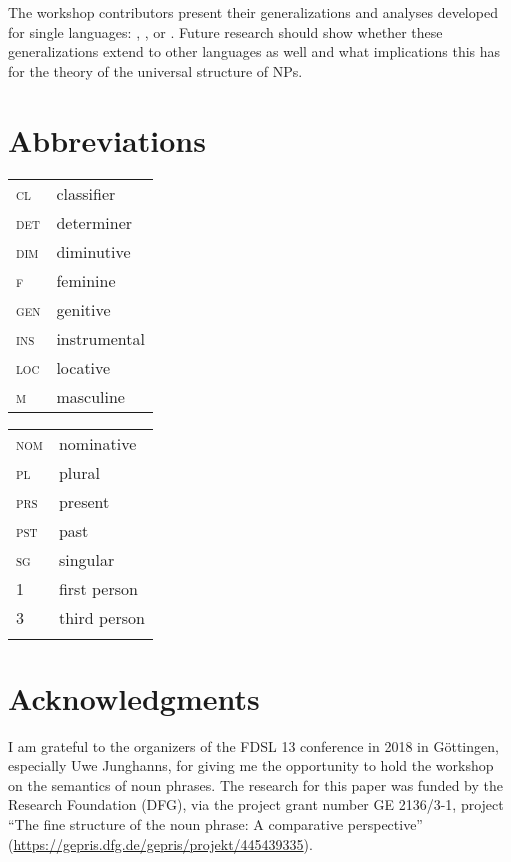 \documentclass[output=paper]{langscibook}
\begin{document}
The workshop contributors present their generalizations and analyses developed for single languages: , , or . Future research should show whether these generalizations extend to other  languages as well and what implications this has for the theory of the universal structure of NPs.

\section*{Abbreviations}

\begin{tabularx}{.5\textwidth}{@{}lX@{}}
\textsc{cl}&{classifier}\\
\textsc{det}&{determiner}\\
\textsc{dim}&{diminutive}\\
\textsc{f}&{feminine}\\
\textsc{gen}&{genitive}\\
\textsc{ins}&{instrumental}\\
\textsc{loc}&{locative}\\
\textsc{m}&{masculine}\\
\end{tabularx}%
\begin{tabularx}{.5\textwidth}{@{}lX@{}}
\textsc{nom}&{nominative}\\
\textsc{pl}&{plural}\\
\textsc{prs}&{present}\\
\textsc{pst}&{past}\\
\textsc{sg}&{singular}\\
\textsc{1}&{first person}\\
\textsc{3}&{third person}\\
&\\
\end{tabularx}

\section*{Acknowledgments}
I am grateful to the organizers of the FDSL 13 conference in 2018 in Göttingen, especially Uwe Junghanns, for giving me the opportunity to hold the workshop on the semantics of noun phrases. The research for this paper was funded by the  Research Foundation (DFG), via the project grant number GE 2136/3-1, project ``The fine structure of the  noun phrase: A comparative perspective'' (\url{https://gepris.dfg.de/gepris/projekt/445439335}).

\sloppy
\printbibliography[heading=subbibliography,notkeyword=this]
\end{document}
